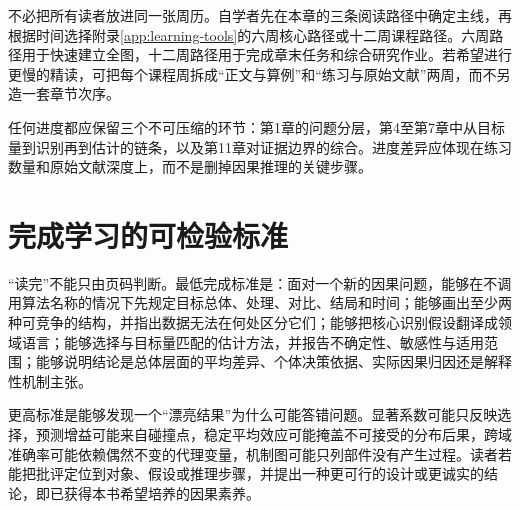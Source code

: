 不必把所有读者放进同一张周历。自学者先在本章的三条阅读路径中确定主线，再根据时间选择附录\ref{app:learning-tools}的六周核心路径或十二周课程路径。六周路径用于快速建立全图，十二周路径用于完成章末任务和综合研究作业。若希望进行更慢的精读，可把每个课程周拆成“正文与算例”和“练习与原始文献”两周，而不另造一套章节次序。

任何进度都应保留三个不可压缩的环节：第1章的问题分层，第4至第7章中从目标量到识别再到估计的链条，以及第11章对证据边界的综合。进度差异应体现在练习数量和原始文献深度上，而不是删掉因果推理的关键步骤。

\section*{完成学习的可检验标准}

“读完”不能只由页码判断。最低完成标准是：面对一个新的因果问题，能够在不调用算法名称的情况下先规定目标总体、处理、对比、结局和时间；能够画出至少两种可竞争的结构，并指出数据无法在何处区分它们；能够把核心识别假设翻译成领域语言；能够选择与目标量匹配的估计方法，并报告不确定性、敏感性与适用范围；能够说明结论是总体层面的平均差异、个体决策依据、实际因果归因还是解释性机制主张。

更高标准是能够发现一个“漂亮结果”为什么可能答错问题。显著系数可能只反映选择，预测增益可能来自碰撞点，稳定平均效应可能掩盖不可接受的分布后果，跨域准确率可能依赖偶然不变的代理变量，机制图可能只列部件没有产生过程。读者若能把批评定位到对象、假设或推理步骤，并提出一种更可行的设计或更诚实的结论，即已获得本书希望培养的因果素养。
